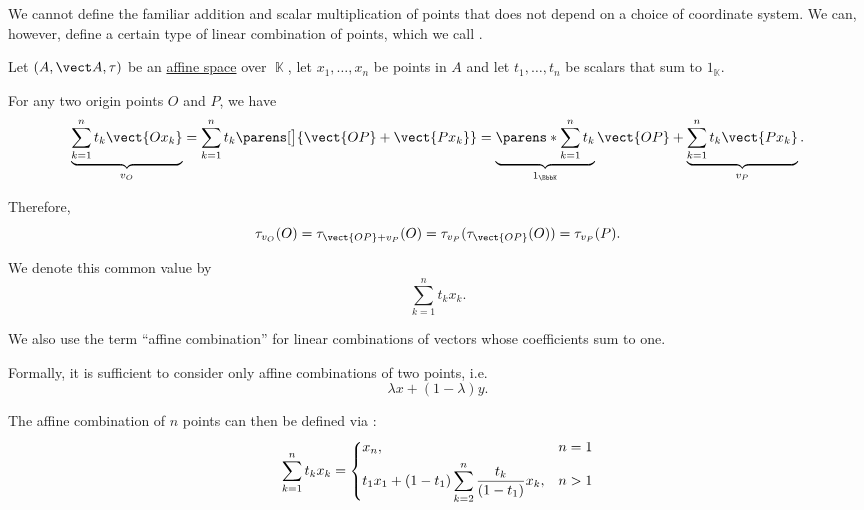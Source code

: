 \begin{definition}\label{def:affine_combinations}
  We cannot define the familiar addition and scalar multiplication of points that does not depend on a choice of coordinate system. We can, however, define a certain type of linear combination of points, which we call .

  Let \( (A, \vect A, \tau) \) be an \hyperref[def:affine_space]{affine space} over \( \BbbK \), let \( x_1, \ldots, x_n \) be points in \( A \) and let \( t_1, \ldots, t_n \) be scalars that sum to \( 1_\BbbK \).

  For any two origin points \( O \) and \( P \), we have
  \begin{equation*}
    \underbrace{ \sum_{k=1}^n t_k \vect{O x_k} }_{v_O}
    =
    \sum_{k=1}^n t_k \parens[\big]{ \vect{OP} + \vect{P x_k} }
    =
    \underbrace{ \parens*{ \sum_{k=1}^n t_k } }_{1_\BbbK} \vect{OP} + \underbrace{ \sum_{k=1}^n t_k \vect{P x_k} }_{v_P}.
  \end{equation*}

  Therefore,
  \begin{equation*}
    \tau_{v_O}(O) = \tau_{\vect{OP} + v_P}(O) = \tau_{v_P}(\tau_{\vect{OP}}(O)) = \tau_{v_P}(P).
  \end{equation*}

  We denote this common value by
  \begin{equation*}
    \sum_{k=1}^n t_k x_k.
  \end{equation*}

  We also use the term \enquote{affine combination} for linear combinations of vectors whose coefficients sum to one.

  Formally, it is sufficient to consider only affine combinations of two points, i.e.
  \begin{equation}\label{eq:def:affine_combinations}
    \lambda x + (1 - \lambda) y.
  \end{equation}

  The affine combination of \( n \) points can then be defined via :
  \begin{equation*}
    \sum_{k=1}^n t_k x_k = \begin{dcases}
      x_n,                                                          &n = 1 \\
      t_1 x_1 + (1 - t_1) \sum_{k=2}^n \frac {t_k} {(1 - t_1)} x_k, &n > 1
    \end{dcases}
  \end{equation*}
\end{definition}

